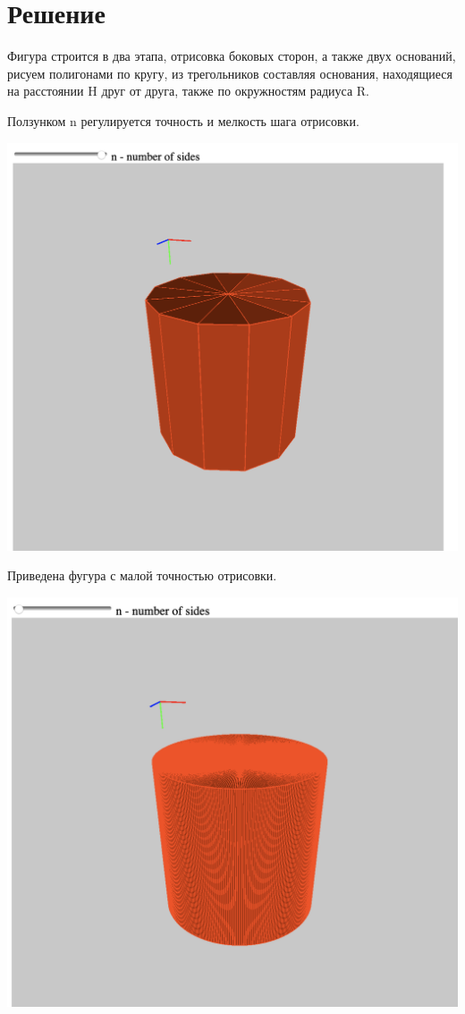\section{Решение}

Фигура строится в два этапа, отрисовка боковых сторон, а также двух оснований, рисуем полигонами по кругу, из трегольников составляя основания, находящиеся на расстоянии H друг от друга, также по окружностям радиуса R.


Ползунком n регулируется точность и мелкость шага отрисовки.

\includegraphics[scale=0.5]{pictures/1.png}

Приведена фугура с малой точностью отрисовки.

\includegraphics[scale=0.4]{pictures/2.png}

